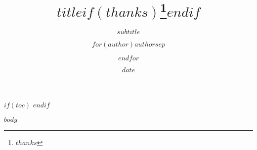 \documentclass[titlepage]{article}
\title{$title$$if(thanks)$\thanks{$thanks$}$endif$}
\subtitle{$subtitle$}
\author{$for(author)$$author$$sep$ \and $endfor$}
\date{$date$}
\begin{document}
\maketitle

$if(toc)$
\tableofcontents
\newpage
\mainmatter
$endif$

$body$
\end{document}
